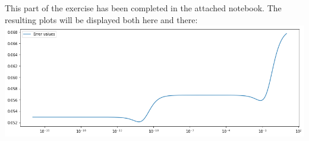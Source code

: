 This part of the exercise has been completed in the attached notebook. The resulting plots will be displayed both here and there:\\
\includegraphics[width=1\linewidth]{2b.png}